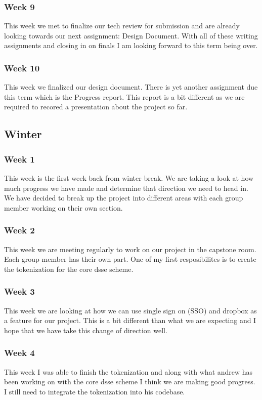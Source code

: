 \subsubsection{Week 9}
This week we met to finalize our tech review for submission and are already looking towards our next assignment: Design Document. With all of these writing assignments and closing in on finals I am looking forward to this term being over.
\subsubsection{Week 10}
This week we finalized our design document. There is yet another assignment due this term which is the Progress report. This report is a bit different as we are required to recored a presentation about the project so far.
\subsection{Winter}
\subsubsection{Week 1}
This week is the first week back from winter break. We are taking a look at how much progress we have made and determine that direction we need to head in. We have decided to break up the project into different areas with each group member working on their own section.
\subsubsection{Week 2}
This week we are meeting regularly to work on our project in the capstone room. Each group member has their own part. One of my first resposibilites is to create the tokenization for the core dsse scheme.
\subsubsection{Week 3}
This week we are looking at how we can use single sign on (SSO) and dropbox as a feature for our project. This is a bit different than what we are expecting and I hope that we have take this change of direction well.
\subsubsection{Week 4}
This week I was able to finish the tokenization and along with what andrew has been working on with the core dsse scheme I think we are making good progress. I still need to integrate the tokenization into his codebase.
